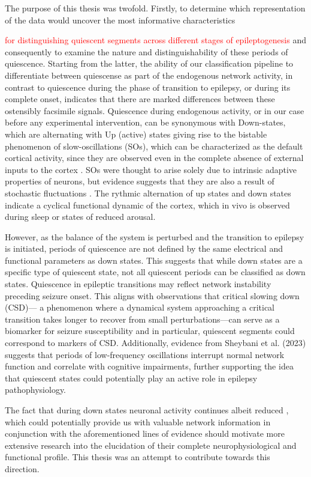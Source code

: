 \documentclass{article}
\begin{document}
The purpose of this thesis was twofold. Firstly, to determine which representation of the data would uncover the most informative characteristics {\textcolor{red}{for distinguishing quiescent segments across different stages of epileptogenesis} and consequently to examine the nature and distinguishability of these periods of quiescence. Starting from the latter, the ability of our classification pipeline to differentiate between quiescense as part of the endogenous network activity, in contrast to quiescence during the phase of transition to epilepsy, or during its complete onset, indicates that there are marked differences between these ostensibly facsimile signals. Quiescence during endogenous activity, or in our case before any experimental intervention, can be synonymous with Down-states, which are alternating with Up (active) states giving rise to the bistable phenomenon of slow-oscillations (SOs), which can be characterized as the default cortical activity, since they are observed even in the complete absence of external inputs to the cortex \cite{sanchez2017}. SOs were thought to arise solely due to intrinsic adaptive properties of neurons, but evidence suggests that they are also a result of stochastic fluctuations \cite{jercog2017}. The rythmic alternation of up states and down states indicate a cyclical functional dynamic of the cortex, which in vivo is observed during sleep or states of reduced arousal.

However, as the balance of the system is perturbed and the transition to epilepsy is initiated, periods of quiescence are not defined by the same electrical and functional parameters as down states. This suggests that while down states are a specific type of quiescent state, not all quiescent periods can be classified as down states.  Quiescence in epileptic transitions may reflect network instability preceding seizure onset. This aligns with observations that critical slowing down (CSD)— a phenomenon where a dynamical system approaching a critical transition takes longer to recover from small perturbations—can serve as a biomarker for seizure susceptibility \cite{maturana2020} and in particular, quiescent segments could correspond to markers of CSD. Additionally, evidence from Sheybani et al. (2023) \cite{sheybani2023} suggests that periods of low-frequency oscillations interrupt normal network function and correlate with cognitive impairments, further supporting the idea that quiescent states could potentially play an active role in epilepsy pathophysiology.

The fact that during down states neuronal activity continues albeit reduced \cite{reig2010}, which could potentially provide us with valuable network information in conjunction with the aforementioned lines of evidence should motivate more extensive research into the elucidation of their complete neurophysiological and functional profile. This thesis was an attempt to contribute towards this direction.

}
\end{document}
